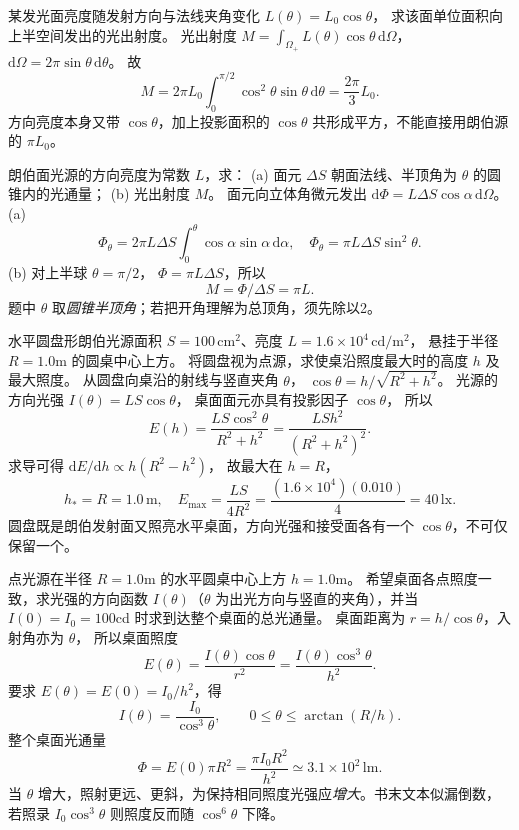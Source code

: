 某发光面亮度随发射方向与法线夹角变化
$L(\theta)=L_0\cos\theta$，
求该面单位面积向上半空间发出的光出射度。
\exsolution
光出射度
$M=\int_{\Omega_+}L(\theta)\cos\theta\,\mathrm d\Omega$，
$\mathrm d\Omega=2\pi\sin\theta\,\mathrm d\theta$。
故
\[
M=2\pi L_0\int_0^{\pi/2}
\cos^2\theta\sin\theta\,\mathrm d\theta
=\boxed{\frac{2\pi}{3}L_0}.
\]
\excheck 方向亮度本身又带 $\cos\theta$，加上投影面积的 $\cos\theta$ 共形成平方，不能直接用朗伯源的 $\pi L_0$。

朗伯面光源的方向亮度为常数 $L$，求：
(a) 面元 $\Delta S$ 朝面法线、半顶角为 $\theta$ 的圆锥内的光通量；
(b) 光出射度 $M$。
\exsolution
面元向立体角微元发出
$\mathrm d\Phi=L\Delta S\cos\alpha\,\mathrm d\Omega$。
(a)
\[
\Phi_\theta=2\pi L\Delta S
\int_0^\theta\cos\alpha\sin\alpha\,\mathrm d\alpha,
\quad
\boxed{\Phi_\theta=\pi L\Delta S\sin^2\theta}.
\]
(b) 对上半球 $\theta=\pi/2$，
$\Phi=\pi L\Delta S$，所以
\[
\boxed{M=\Phi/\Delta S=\pi L}.
\]
\excheck 题中 $\theta$ 取\emph{圆锥半顶角}；若把开角理解为总顶角，须先除以2。

水平圆盘形朗伯光源面积
$S=100\,\mathrm{cm^2}$、亮度
$L=1.6\times10^4\,\mathrm{cd/m^2}$，
悬挂于半径 $R=1.0$m 的圆桌中心上方。
将圆盘视为点源，求使桌沿照度最大时的高度 $h$ 及最大照度。
\exsolution
从圆盘向桌沿的射线与竖直夹角 $\theta$，
$\cos\theta=h/\sqrt{R^2+h^2}$。
光源的方向光强 $I(\theta)=LS\cos\theta$，
桌面面元亦具有投影因子 $\cos\theta$，
所以
\[
E(h)=\frac{LS\cos^2\theta}{R^2+h^2}
=\frac{LSh^2}{(R^2+h^2)^2}.
\]
求导可得
$\mathrm dE/\mathrm dh\propto h(R^2-h^2)$，
故最大在 $h=R$，
\[
\boxed{h_*=R=1.0\,\mathrm m},\quad
\boxed{E_{\max}=\frac{LS}{4R^2}
=\frac{(1.6\times10^4)(0.010)}4
=40\,\mathrm{lx}}.
\]
\excheck 圆盘既是朗伯发射面又照亮水平桌面，方向光强和接受面各有一个 $\cos\theta$，不可仅保留一个。

点光源在半径 $R=1.0$m 的水平圆桌中心上方
$h=1.0$m。
希望桌面各点照度一致，求光强的方向函数
$I(\theta)$（$\theta$ 为出光方向与竖直的夹角），并当
$I(0)=I_0=100$cd 时求到达整个桌面的总光通量。
\exsolution
桌面距离为
$r=h/\cos\theta$，入射角亦为 $\theta$，
所以桌面照度
\[
E(\theta)=\frac{I(\theta)\cos\theta}{r^2}
=\frac{I(\theta)\cos^3\theta}{h^2}.
\]
要求 $E(\theta)=E(0)=I_0/h^2$，得
\[
\boxed{I(\theta)=\frac{I_0}{\cos^3\theta}},\qquad
0\le\theta\le\arctan(R/h).
\]
整个桌面光通量
\[
\boxed{\Phi=E(0)\pi R^2
=\frac{\pi I_0R^2}{h^2}
\simeq3.1\times10^2\,\mathrm{lm}}.
\]
\excheck 当 $\theta$ 增大，照射更远、更斜，为保持相同照度光强应\emph{增大}。书末文本似漏倒数，若照录 $I_0\cos^3\theta$ 则照度反而随 $\cos^6\theta$ 下降。

